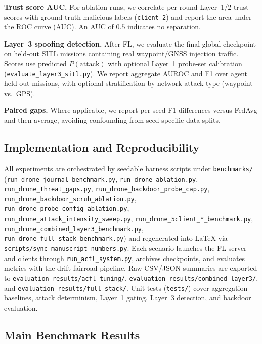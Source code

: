 \textbf{Trust score AUC.} For ablation runs, we correlate per-round Layer~1/2 trust scores with ground-truth malicious labels (\texttt{client\_2}) and report the area under the ROC curve (AUC).
An AUC of $0.5$ indicates no separation.

\textbf{Layer~3 spoofing detection.} After FL, we evaluate the final global checkpoint on held-out SITL missions containing real waypoint/GNSS injection traffic.
Scores use predicted $P(\text{attack})$ with optional Layer~1 probe-set calibration (\texttt{evaluate\_layer3\_sitl.py}).
We report aggregate AUROC and F1 over agent held-out missions, with optional stratification by network attack type (waypoint vs.\ GPS).

\textbf{Paired gaps.} Where applicable, we report per-seed F1 differences versus FedAvg and then average, avoiding confounding from seed-specific data splits.

\subsection{Implementation and Reproducibility}
\label{sec:exp-repro}

All experiments are orchestrated by seedable harness scripts under \texttt{benchmarks/}
(\texttt{run\_drone\_journal\_benchmark.py}, \texttt{run\_drone\_ablation.py},
\texttt{run\_drone\_threat\_gaps.py},
\texttt{run\_drone\_backdoor\_probe\_cap.py},
\texttt{run\_drone\_backdoor\_scrub\_ablation.py},
\texttt{run\_drone\_probe\_config\_ablation.py},
\texttt{run\_drone\_attack\_intensity\_sweep.py},
\texttt{run\_drone\_5client\_*\_benchmark.py},
\texttt{run\_drone\_combined\_layer3\_benchmark.py},
\texttt{run\_drone\_full\_stack\_benchmark.py})
and regenerated into LaTeX via \texttt{scripts/sync\_manuscript\_numbers.py}.
Each scenario launches the FL server and clients through \texttt{run\_acfl\_system.py}, archives checkpoints, and evaluates metrics with the drift-fairroad pipeline.
Raw CSV/JSON summaries are exported to \texttt{evaluation\_results/acfl\_tuning/}, \texttt{evaluation\_results/combined\_layer3/}, and \texttt{evaluation\_results/full\_stack/}.
Unit tests (\texttt{tests/}) cover aggregation baselines, attack determinism, Layer~1 gating, Layer~3 detection, and backdoor evaluation.

\subsection{Main Benchmark Results}
\label{sec:exp-main}

